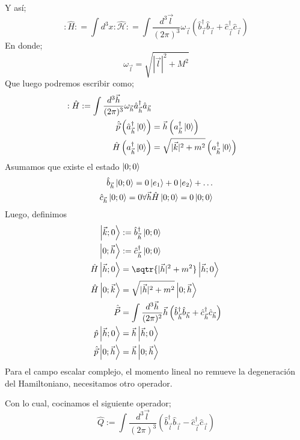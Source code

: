 \documentclass[../main.tex]{subfiles}
\begin{document}
Y así;
\begin{equation}
  :\hat{H}: = \int d^3x :\hat{\mathcal{H}}: = \int \frac{d^3\vec{l}}{(2\pi)^3} \omega_{\vec{l}} \left( \hat{b}^\dagger_{\vec{l}}\hat{b}_{\vec{l}} + \hat{c}^\dagger_{\vec{l}}\hat{c}_{\vec{l}} \right)
 \end{equation}
 En donde;
 \begin{equation}
   \omega_{\vec{l}} = \sqrt{|\vec{l}|^2 + M^2}
  \end{equation}
  Que luego podremos escribir como;
\begin{align}
  :\hat{H}:= \int \frac{d^3\vec{h}}{(2\pi)^3}  \omega_{\vec{h}} \hat{a}^\dagger_{\vec{h}} \hat{a}_{\vec{h}} \\
  \hat{\vec{p}} \left( \hat{a}^\dagger_{\vec{h}} \ket{0}\right) & = \vec{h} \left( a^\dagger_{\vec{h}} \ket{0}\right) \\
  \hat{H} \left( a^\dagger_{\vec{h}} \ket{0} \right) & = \sqrt{ |\vec{k}|^2 + m^2 } \left( a^\dagger_{\vec{h}} \ket{0}\right)
\end{align} 
Asumamos que existe el estado $\ket{0;0}$
\begin{align*}
  \hat{b}_{\vec{h}} \ket{0;0} =  0\ket{e_1} + 0 \ket{e_2} + \dots \\
  \hat{c}_{\vec{h}} \ket{0;0} = 0 \forall \vec{h}
  \hat{H} \ket{0;0} = 0 \ket{0;0}
\end{align*}
Luego, definimos
\begin{align*}
  \ket{\vec{k};0} & := \hat{b}^\dagger_{\vec{h}} \ket{0;0} \\
  \ket{0;\vec{h}} &:= \hat{c}^\dagger_{\vec{h}} \ket{0;0} \\
  \hat{H}\ket{\vec{h};0} & = \sqtr{|\vec{h}|^2+m^2} \ket{\vec{h};0} \\
  \hat{H}\ket{0;\vec{k}} & =  \sqrt{|\vec{h}|^2+m^2} \ket{0;\vec{h}} \\
  \hat{\vec{P}} & = \int \frac{d^3\vec{h}}{(2\pi)^2} \vec{h} \left( \hat{b}^\dagger_{\vec{h}} \hat{b}_{\vec{h}} + \hat{c}_{\vec{h}}^\dagger \hat{c}_{\vec{h}} \right) \\
  \hat{p}\ket{\vec{h};0} & = \vec{h}\ket{\vec{h};0} \\
  \hat{\vec{p}} \ket{0;\vec{h}} & = \vec{h} \ket{0;\vec{h}}
\end{align*}
Para el campo escalar complejo, el momento lineal no remueve la degeneración del Hamiltoniano, necesitamos otro operador. \par
Con lo cual, cocinamos el siguiente operador;
\begin{equation}
  \hat{Q} := \int \frac{d^3\vec{l}}{(2\pi)^3} \left( \hat{b}_{\vec{l}}^\dagger \hat{b}_{\vec{l}} - \hat{c}^\dagger_{\vec{l}}\hat{c}_{\vec{l}}\right) 
 \end{equation}
\end{document}
